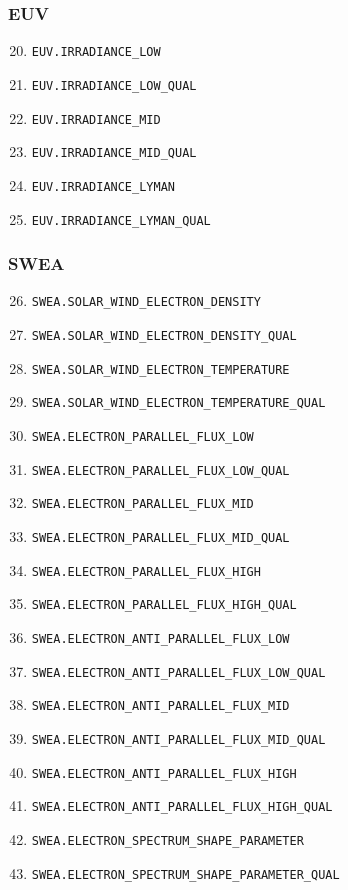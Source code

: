 \documentclass{article}
\begin{document}
\subsubsection{EUV}
\begin{enumerate}
\setcounter{enumi}{19}
    \item \texttt{EUV.IRRADIANCE\_LOW}
    \item \texttt{EUV.IRRADIANCE\_LOW\_QUAL}
    \item \texttt{EUV.IRRADIANCE\_MID}
    \item \texttt{EUV.IRRADIANCE\_MID\_QUAL}
    \item \texttt{EUV.IRRADIANCE\_LYMAN}
    \item \texttt{EUV.IRRADIANCE\_LYMAN\_QUAL}
\end{enumerate}

\subsubsection{SWEA}
\begin{enumerate}
\setcounter{enumi}{25}
    \item \texttt{SWEA.SOLAR\_WIND\_ELECTRON\_DENSITY}
    \item \texttt{SWEA.SOLAR\_WIND\_ELECTRON\_DENSITY\_QUAL}
    \item \texttt{SWEA.SOLAR\_WIND\_ELECTRON\_TEMPERATURE}
    \item \texttt{SWEA.SOLAR\_WIND\_ELECTRON\_TEMPERATURE\_QUAL}
    \item \texttt{SWEA.ELECTRON\_PARALLEL\_FLUX\_LOW}
    \item \texttt{SWEA.ELECTRON\_PARALLEL\_FLUX\_LOW\_QUAL}
    \item \texttt{SWEA.ELECTRON\_PARALLEL\_FLUX\_MID}
    \item \texttt{SWEA.ELECTRON\_PARALLEL\_FLUX\_MID\_QUAL}
    \item \texttt{SWEA.ELECTRON\_PARALLEL\_FLUX\_HIGH}
    \item \texttt{SWEA.ELECTRON\_PARALLEL\_FLUX\_HIGH\_QUAL}
    \item \texttt{SWEA.ELECTRON\_ANTI\_PARALLEL\_FLUX\_LOW}
    \item \texttt{SWEA.ELECTRON\_ANTI\_PARALLEL\_FLUX\_LOW\_QUAL}
    \item \texttt{SWEA.ELECTRON\_ANTI\_PARALLEL\_FLUX\_MID}
    \item \texttt{SWEA.ELECTRON\_ANTI\_PARALLEL\_FLUX\_MID\_QUAL}
    \item \texttt{SWEA.ELECTRON\_ANTI\_PARALLEL\_FLUX\_HIGH}
    \item \texttt{SWEA.ELECTRON\_ANTI\_PARALLEL\_FLUX\_HIGH\_QUAL}
    \item \texttt{SWEA.ELECTRON\_SPECTRUM\_SHAPE\_PARAMETER}
    \item \texttt{SWEA.ELECTRON\_SPECTRUM\_SHAPE\_PARAMETER\_QUAL}
\end{enumerate}
\end{document}
